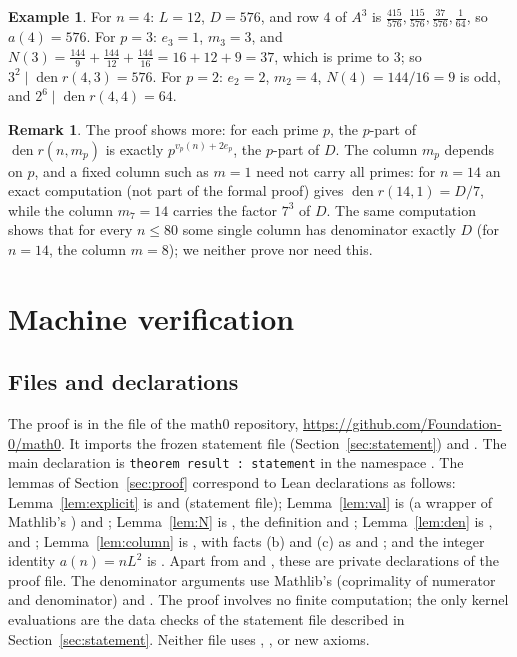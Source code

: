 \documentclass[11pt]{amsart}
\theoremstyle{plain}
\theoremstyle{definition}
\newtheorem{remark}[theorem]{Remark}
\newtheorem{example}[theorem]{Example}
\newcommand{\code}[1]{\texttt{#1}}
\DeclareMathOperator{\den}{den}
\begin{document}
\begin{example}
For $n=4$: $L=12$, $D=576$, and row $4$ of $A^3$ is $\frac{415}{576},\frac{115}{576},\frac{37}{576},\frac1{64}$, so $a(4)=576$. For $p=3$: $e_3=1$, $m_3=3$, and $N(3)=\frac{144}{9}+\frac{144}{12}+\frac{144}{16}=16+12+9=37$, which is prime to $3$; so $3^2\mid\den r(4,3)=576$. For $p=2$: $e_2=2$, $m_2=4$, $N(4)=144/16=9$ is odd, and $2^6\mid\den r(4,4)=64$.
\end{example}

\begin{remark}
The proof shows more: for each prime $p$, the $p$-part of $\den r(n,m_p)$ is exactly $p^{v_p(n)+2e_p}$, the $p$-part of $D$. The column $m_p$ depends on $p$, and a fixed column such as $m=1$ need not carry all primes: for $n=14$ an exact computation (not part of the formal proof) gives $\den r(14,1)=D/7$, while the column $m_7=14$ carries the factor $7^3$ of $D$. The same computation shows that for every $n\le80$ some single column has denominator exactly $D$ (for $n=14$, the column $m=8$); we neither prove nor need this.
\end{remark}

\section{Machine verification}\label{sec:lean}

\subsection*{Files and declarations}
The proof is in the file  of the math0 repository, \url{https://github.com/Foundation-0/math0}. It imports the frozen statement file (Section~\ref{sec:statement}) and . The main declaration is \code{theorem result : statement} in the namespace . The lemmas of Section~\ref{sec:proof} correspond to Lean declarations as follows: Lemma~\ref{lem:explicit} is  and  (statement file); Lemma~\ref{lem:val} is  (a wrapper of Mathlib's ) and ; Lemma~\ref{lem:N} is , the definition  and ; Lemma~\ref{lem:den} is ,  and ; Lemma~\ref{lem:column} is , with facts (b) and (c) as  and ; and the integer identity $a(n)=nL^2$ is . Apart from  and , these are private declarations of the proof file. The denominator arguments use Mathlib's  (coprimality of numerator and denominator) and . The proof involves no finite computation; the only kernel evaluations are the data checks of the statement file described in Section~\ref{sec:statement}. Neither file uses , ,  or new axioms.
\end{document}
